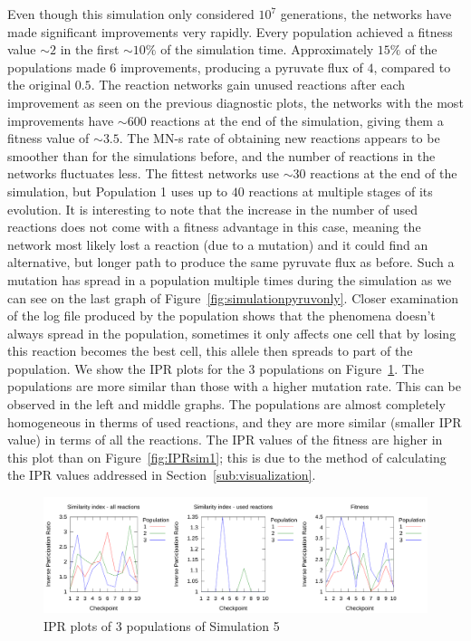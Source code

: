 \documentclass[a4paper,12pt]{article}
\begin{document}
Even though this simulation only considered $10^7$ generations, the networks have made significant improvements very rapidly. Every population achieved a fitness value $\sim 2$ in the first $\sim 10\%$ of the simulation time. Approximately $15\%$ of the populations made $6$ improvements, producing a pyruvate flux of $4$, compared to the original $0.5$. The reaction networks gain unused reactions after each improvement as seen on the previous diagnostic plots, the networks with the most improvements have $\sim 600$ reactions at the end of the simulation, giving them a fitness value of $\sim 3.5$. The MN-s rate of obtaining new reactions appears to be smoother than for the simulations before, and the number of reactions in the networks fluctuates less. The fittest networks use $\sim 30$ reactions at the end of the simulation, but Population 1 uses up to $40$ reactions at multiple stages of its evolution. It is interesting to note that the increase in the number of used reactions does not come with a fitness advantage in this case, meaning the network most likely lost a reaction (due to a mutation) and it could find an alternative, but longer path to produce the same pyruvate flux as before. Such a mutation has spread in a population multiple times during the simulation as we can see on the last graph of Figure~\ref{fig:simulationpyruvonly}. Closer examination of the log file produced by the population shows that the phenomena doesn't always spread in the population, sometimes it only affects one cell that by losing this reaction becomes the best cell, this allele then spreads to part of the population. We show the IPR plots for the $3$ populations on Figure~\ref{fig:iprsim5}. The populations are more similar than those with a higher mutation rate. This can be observed in the left and middle graphs. The populations are almost completely homogeneous in therms of used reactions, and they are more similar (smaller IPR value) in terms of all the reactions. The IPR values of the fitness are higher in this plot than on Figure~\ref{fig:IPRsim1}; this is due to the method of calculating the IPR values addressed in Section~\ref{sub:visualization}. 

\begin{figure}[htpb]
	\centering
	\includegraphics[width=1\linewidth]{iprsim5.pdf}
	\caption{IPR plots of 3 populations of Simulation 5}
	\label{fig:iprsim5}
\end{figure}
\end{document}
